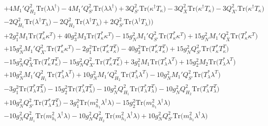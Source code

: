 {\begin{align}
 &+4 M_1' Q_{H_2}^{2} \mbox{Tr}\Big({\lambda  \lambda^{\dagger}}\Big) -4 M_1' Q_{S'}^{2} \mbox{Tr}\Big({\lambda  \lambda^{\dagger}}\Big) +3 Q_{S'}^{2} \mbox{Tr}\Big({\kappa^{\dagger}  T_{\kappa}}\Big) -3 Q_{\bar{X}}^{2} \mbox{Tr}\Big({\kappa^{\dagger}  T_{\kappa}}\Big) -3 Q_{X'}^{2} \mbox{Tr}\Big({\kappa^{\dagger}  T_{\kappa}}\Big) \nonumber \\ 
 &-2 Q_{H_1}^{2} \mbox{Tr}\Big({\lambda^{\dagger}  T_{\lambda}}\Big) -2 Q_{H_2}^{2} \mbox{Tr}\Big({\lambda^{\dagger}  T_{\lambda}}\Big) +2 Q_{S'}^{2} \mbox{Tr}\Big({\lambda^{\dagger}  T_{\lambda}}\Big) \Big)\nonumber \\ 
 &+2 g_{1}^{2} M_1 \mbox{Tr}\Big({T_{\kappa}^*  \kappa^{T}}\Big) +40 g_{3}^{2} M_3 \mbox{Tr}\Big({T_{\kappa}^*  \kappa^{T}}\Big) -15 g_{N}^{2} M_1' Q_{S'}^{2} \mbox{Tr}\Big({T_{\kappa}^*  \kappa^{T}}\Big) +15 g_{N}^{2} M_1' Q_{\bar{X}}^{2} \mbox{Tr}\Big({T_{\kappa}^*  \kappa^{T}}\Big) \nonumber \\ 
 &+15 g_{N}^{2} M_1' Q_{X'}^{2} \mbox{Tr}\Big({T_{\kappa}^*  \kappa^{T}}\Big) -2 g_{1}^{2} \mbox{Tr}\Big({T_{\kappa}^*  T_{\kappa}^{T}}\Big) -40 g_{3}^{2} \mbox{Tr}\Big({T_{\kappa}^*  T_{\kappa}^{T}}\Big) +15 g_{N}^{2} Q_{S'}^{2} \mbox{Tr}\Big({T_{\kappa}^*  T_{\kappa}^{T}}\Big) \nonumber \\ 
 &-15 g_{N}^{2} Q_{\bar{X}}^{2} \mbox{Tr}\Big({T_{\kappa}^*  T_{\kappa}^{T}}\Big) -15 g_{N}^{2} Q_{X'}^{2} \mbox{Tr}\Big({T_{\kappa}^*  T_{\kappa}^{T}}\Big) +3 g_{1}^{2} M_1 \mbox{Tr}\Big({T_{\lambda}^*  \lambda^{T}}\Big) +15 g_{2}^{2} M_2 \mbox{Tr}\Big({T_{\lambda}^*  \lambda^{T}}\Big) \nonumber \\ 
 &+10 g_{N}^{2} M_1' Q_{H_1}^{2} \mbox{Tr}\Big({T_{\lambda}^*  \lambda^{T}}\Big) +10 g_{N}^{2} M_1' Q_{H_2}^{2} \mbox{Tr}\Big({T_{\lambda}^*  \lambda^{T}}\Big) -10 g_{N}^{2} M_1' Q_{S'}^{2} \mbox{Tr}\Big({T_{\lambda}^*  \lambda^{T}}\Big) \nonumber \\ 
 &-3 g_{1}^{2} \mbox{Tr}\Big({T_{\lambda}^*  T_{\lambda}^{T}}\Big) -15 g_{2}^{2} \mbox{Tr}\Big({T_{\lambda}^*  T_{\lambda}^{T}}\Big) -10 g_{N}^{2} Q_{H_1}^{2} \mbox{Tr}\Big({T_{\lambda}^*  T_{\lambda}^{T}}\Big) -10 g_{N}^{2} Q_{H_2}^{2} \mbox{Tr}\Big({T_{\lambda}^*  T_{\lambda}^{T}}\Big) \nonumber \\ 
 &+10 g_{N}^{2} Q_{S'}^{2} \mbox{Tr}\Big({T_{\lambda}^*  T_{\lambda}^{T}}\Big) -3 g_{1}^{2} \mbox{Tr}\Big({m_{h_1}^2  \lambda^{\dagger}  \lambda}\Big) -15 g_{2}^{2} \mbox{Tr}\Big({m_{h_1}^2  \lambda^{\dagger}  \lambda}\Big) \nonumber \\ 
 &-10 g_{N}^{2} Q_{H_1}^{2} \mbox{Tr}\Big({m_{h_1}^2  \lambda^{\dagger}  \lambda}\Big) -10 g_{N}^{2} Q_{H_2}^{2} \mbox{Tr}\Big({m_{h_1}^2  \lambda^{\dagger}  \lambda}\Big) +10 g_{N}^{2} Q_{S'}^{2} \mbox{Tr}\Big({m_{h_1}^2  \lambda^{\dagger}  \lambda}\Big) \nonumber \\ 

\end{align}}
